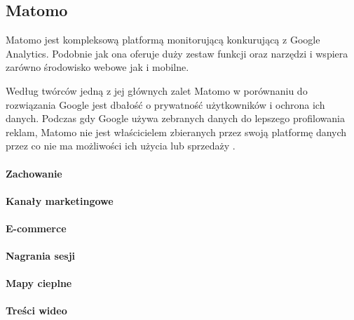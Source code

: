 \subsection{Matomo}
Matomo jest kompleksową platformą monitorującą konkurującą z Google Analytics. Podobnie jak ona oferuje duży zestaw funkcji oraz narzędzi i wspiera zarówno środowisko webowe jak i mobilne. 

Według twórców jedną z jej głównych zalet Matomo w porównaniu do rozwiązania Google jest dbałość o prywatność użytkowników i ochrona ich danych. Podczas gdy Google używa zebranych danych do lepszego profilowania reklam, Matomo nie jest właścicielem zbieranych przez swoją platformę danych przez co nie ma możliwości ich użycia lub sprzedaży \cite{Matomo_Data}.

\paragraph{Zachowanie}

\paragraph{Kanały marketingowe}

\paragraph{E-commerce}

\paragraph{Nagrania sesji}

\paragraph{Mapy cieplne}

\paragraph{Treści wideo}

